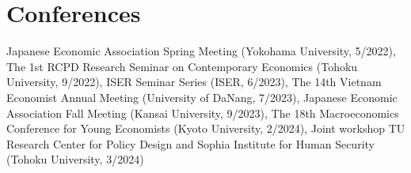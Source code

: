 \newcommand{\playsymbol}{$\blacktriangleright$}

\section{\sc Conferences}
Japanese Economic Association Spring Meeting (Yokohama University, 5/2022), 
The 1st RCPD Research Seminar on Contemporary Economics (Tohoku University, 9/2022), 
ISER Seminar Series (ISER, 6/2023),
The 14th Vietnam Economist Annual Meeting (University of DaNang, 7/2023),
Japanese Economic Association Fall Meeting (Kansai University, 9/2023),
The 18th Macroeconomics Conference for Young Economists (Kyoto University, 2/2024), 
Joint workshop TU Research Center for Policy Design and Sophia Institute for Human Security (Tohoku University, 3/2024)



